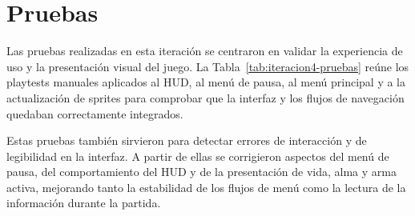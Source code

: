 \section{Pruebas}
Las pruebas realizadas en esta iteración se centraron en validar la experiencia de uso y la
presentación visual del juego. La Tabla~\ref{tab:iteracion4-pruebas} reúne los playtests manuales aplicados al
HUD, al menú de pausa, al menú principal y a la actualización de sprites para comprobar que
la interfaz y los flujos de navegación quedaban correctamente integrados.

Estas pruebas también sirvieron para detectar errores de interacción y de legibilidad en la
interfaz. A partir de ellas se corrigieron aspectos del menú de pausa, del comportamiento del
HUD y de la presentación de vida, alma y arma activa, mejorando tanto la estabilidad de los
flujos de menú como la lectura de la información durante la partida.

